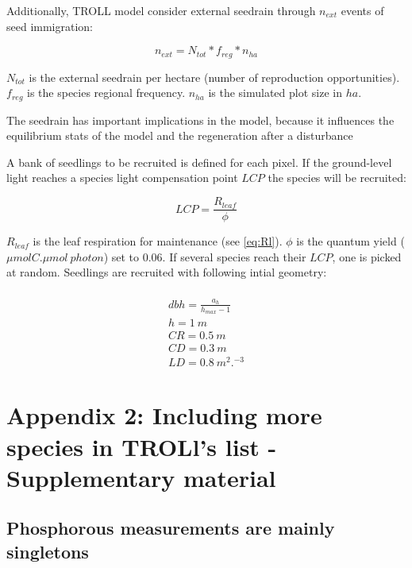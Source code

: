 \documentclass[12pt,]{article}
\let\oldsection\section
\renewcommand\section{\newpage\oldsection}
\theoremstyle{definition}
\theoremstyle{definition}
\theoremstyle{definition}
\theoremstyle{remark}
\begin{document}
Additionally, TROLL model consider external seedrain through \(n_{ext}\)
events of seed immigration:

\begin{equation}
  n_{ext} = N_{tot}*f_{reg}*n_{ha}
  \label{eq:next}
\end{equation}

\(N_{tot}\) is the external seedrain per hectare (number of reproduction
opportunities). \(f_{reg}\) is the species regional frequency.
\(n_{ha}\) is the simulated plot size in \(ha\).

The seedrain has important implications in the model, because it
influences the equilibrium stats of the model and the regeneration after
a disturbance \citep{Schmitt2017}

A bank of seedlings to be recruited is defined for each pixel. If the
ground-level light reaches a species light compensation point \(LCP\)
the species will be recruited:

\begin{equation}
  LCP = \frac{R_{leaf}}{\phi}
  \label{eq:LCP}
\end{equation}

\(R_{leaf}\) is the leaf respiration for maintenance (see \eqref{eq:Rl}).
\(\phi\) is the quantum yield (\(\mu mol C.\mu mol~photon\)) set to
0.06. If several species reach their \(LCP\), one is picked at random.
Seedlings are recruited with following intial geometry:

\begin{equation}
  \begin{array}{c} \\
    dbh = \frac{a_h}{h_{max} - 1}\\
    h = 1~m\\
    CR = 0.5~m\\
    CD = 0.3~m\\
    LD = 0.8~m^2.^{-3}
  \end{array}
  \label{eq:C}
\end{equation}

\section{Appendix 2: Including more species in TROLl's list -
Supplementary
material}\label{appendix-2-including-more-species-in-trolls-list---supplementary-material}

\subsection{Phosphorous measurements are mainly
singletons}\label{phosphorous-measurements-are-mainly-singletons}
\end{document}
